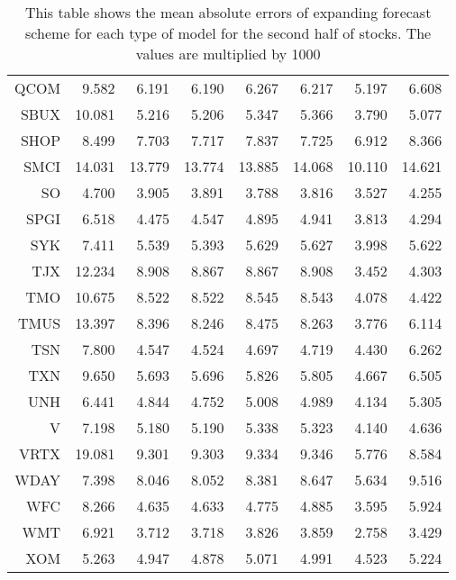 \begin{table}[ht]
\begin{tabular}{rrrrrrrr}
  QCOM & 9.582 & 6.191 & 6.190 & 6.267 & 6.217 & 5.197 & 6.608 \\ 
  SBUX & 10.081 & 5.216 & 5.206 & 5.347 & 5.366 & 3.790 & 5.077 \\ 
  SHOP & 8.499 & 7.703 & 7.717 & 7.837 & 7.725 & 6.912 & 8.366 \\ 
  SMCI & 14.031 & 13.779 & 13.774 & 13.885 & 14.068 & 10.110 & 14.621 \\ 
  SO & 4.700 & 3.905 & 3.891 & 3.788 & 3.816 & 3.527 & 4.255 \\ 
  SPGI & 6.518 & 4.475 & 4.547 & 4.895 & 4.941 & 3.813 & 4.294 \\ 
  SYK & 7.411 & 5.539 & 5.393 & 5.629 & 5.627 & 3.998 & 5.622 \\ 
  TJX & 12.234 & 8.908 & 8.867 & 8.867 & 8.908 & 3.452 & 4.303 \\ 
  TMO & 10.675 & 8.522 & 8.522 & 8.545 & 8.543 & 4.078 & 4.422 \\ 
  TMUS & 13.397 & 8.396 & 8.246 & 8.475 & 8.263 & 3.776 & 6.114 \\ 
  TSN & 7.800 & 4.547 & 4.524 & 4.697 & 4.719 & 4.430 & 6.262 \\ 
  TXN & 9.650 & 5.693 & 5.696 & 5.826 & 5.805 & 4.667 & 6.505 \\ 
  UNH & 6.441 & 4.844 & 4.752 & 5.008 & 4.989 & 4.134 & 5.305 \\ 
  V & 7.198 & 5.180 & 5.190 & 5.338 & 5.323 & 4.140 & 4.636 \\ 
  VRTX & 19.081 & 9.301 & 9.303 & 9.334 & 9.346 & 5.776 & 8.584 \\ 
  WDAY & 7.398 & 8.046 & 8.052 & 8.381 & 8.647 & 5.634 & 9.516 \\ 
  WFC & 8.266 & 4.635 & 4.633 & 4.775 & 4.885 & 3.595 & 5.924 \\ 
  WMT & 6.921 & 3.712 & 3.718 & 3.826 & 3.859 & 2.758 & 3.429 \\ 
  XOM & 5.263 & 4.947 & 4.878 & 5.071 & 4.991 & 4.523 & 5.224 \\ 
   \hline
\end{tabular}
\caption[MAE expanding forecast (2)]{This table shows the mean absolute errors of expanding forecast scheme for each type of model for the second half of stocks. 
                     The values are multiplied by 1000} 
\label{Table:MAE_e_2}
\end{table}
